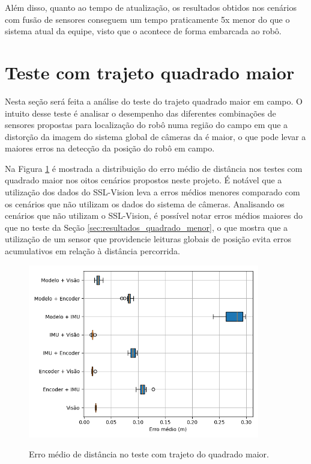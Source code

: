 \documentclass[acronym, symbols, table, deposito]{fei}
\begin{document}
	Além disso, quanto ao tempo de atualização, os resultados obtidos nos cenários com fusão de sensores conseguem um tempo praticamente 5x menor do que o sistema atual da equipe, visto que o  acontece de forma embarcada ao robô.

	\section{Teste com trajeto quadrado maior} \label{sec:resultados_quadrado_maior}
	
		Nesta seção será feita a análise do teste do trajeto quadrado maior em campo. O intuito desse teste é analisar o desempenho das diferentes combinações de sensores propostas para localização do robô numa região do campo em que a distorção da imagem do sistema global de câmeras da  é maior, o que pode levar a maiores erros na detecção da posição do robô em campo.
		
		Na Figura \ref{fig:erro_medio_distancia_quad_maior} é mostrada a distribuição do erro médio de distância nos testes com quadrado maior nos oitos cenários propostos neste projeto. É notável que a utilização dos dados do SSL-Vision leva a erros médios menores comparado com os cenários que não utilizam os dados do sistema de câmeras. Analisando os cenários que não utilizam o SSL-Vision, é possível notar erros médios maiores do que no teste da Seção \ref{sec:resultados_quadrado_menor}, o que mostra que a utilização de um sensor que providencie leituras globais de posição evita erros acumulativos em relação à distância percorrida.
		
		\begin{figure}[!htb]
			\centering
			\caption{Erro médio de distância no teste com trajeto do quadrado maior.}
			\includegraphics[width=0.9\textwidth]{../Dados/Graficos-Resultados/erro_medio_distancia_quadrado_maior.png}
			\label{fig:erro_medio_distancia_quad_maior}
		\end{figure}
	
\end{document}
